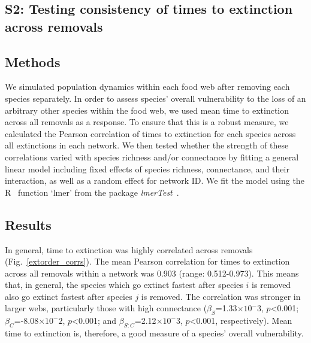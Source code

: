 \documentclass[12pt]{article}
\begin{document}
\begin{spacing}{2.0}
\clearpage

\section*{S2: Testing consistency of times to extinction across removals}

	\subsection*{Methods}

		We simulated population dynamics within each food web after removing each species separately. 
		In order to assess species' overall vulnerability to the loss of an arbitrary other species within the food web, we used mean time to extinction across all removals as a response. 
		To ensure that this is a robust measure, we calculated the Pearson correlation of times to extinction for each species across all extinctions in each network. 
		We then tested whether the strength of these correlations varied with species richness and/or connectance by fitting a general linear model including fixed effects of species richness, connectance, and their interaction, as well as a random effect for network ID. 
		We fit the model using the R~\citep{R} function `lmer' from the package \emph{lmerTest}~\citep{lmerTest}.


	\subsection*{Results}

		In general, time to extinction was highly correlated across removals (Fig.~\ref{extorder_corrs}). %
		The mean Pearson correlation for times to extinction across all removals within a network was 0.903 (range: 0.512-0.973). %
		This means that, in general, the species which go extinct fastest after species $i$ is removed also go extinct fastest after species $j$ is removed.
		The correlation was stronger in larger webs, particularly those with high connectance ($\beta_{S}$=1.33$\times10^-3$, $p$\textless0.001; $\beta_{C}$=-8.08$\times10^-2$, $p$\textless0.001; and $\beta_{S:C}$=2.12$\times10^-3$, $p$\textless0.001, respectively). 
		Mean time to extinction is, therefore, a good measure of a species' overall vulnerability.



\end{spacing}
\end{document}

